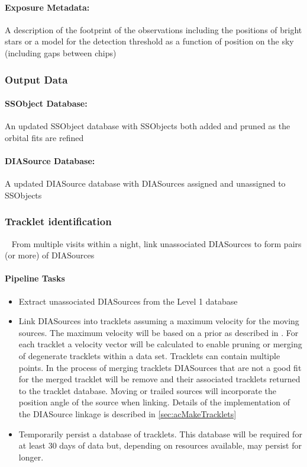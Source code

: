 \paragraph*{Exposure Metadata:} A description of the footprint of the observations including the positions of bright stars or a model for the detection threshold as a function of position on the sky (including gaps between chips)


\subsubsection{Output Data}

\paragraph*{SSObject Database: } An updated SSObject database with SSObjects both added and pruned as the orbital fits are refined

\paragraph*{DIASource Database:} A updated DIASource database with DIASources assigned and unassigned to SSObjects


\subsubsection{Tracklet identification}~
From multiple visits within a night, link unassociated DIASources to form pairs (or more) of DIASources

\paragraph{Pipeline Tasks}
\begin{itemize}
\item Extract unassociated DIASources from the Level 1 database
\item Link DIASources into tracklets assuming a maximum velocity for the moving sources. The maximum velocity will be based on a prior as described in  \cite{kubica05}. For each tracklet a velocity vector will be calculated to enable pruning or merging of degenerate tracklets within a data set. Tracklets can contain multiple points. In the process of merging tracklets DIASources that are not a good fit for the merged tracklet will be remove and their associated tracklets returned to the tracklet database.  Moving or trailed sources will incorporate the position angle of the source when linking. Details of the implementation of the DIASource linkage is described in \ref{sec:acMakeTracklets}
\item Temporarily persist a database of tracklets. This database will be required for at least 30 days of data but, depending on resources available, may persist for longer.
\end{itemize}


